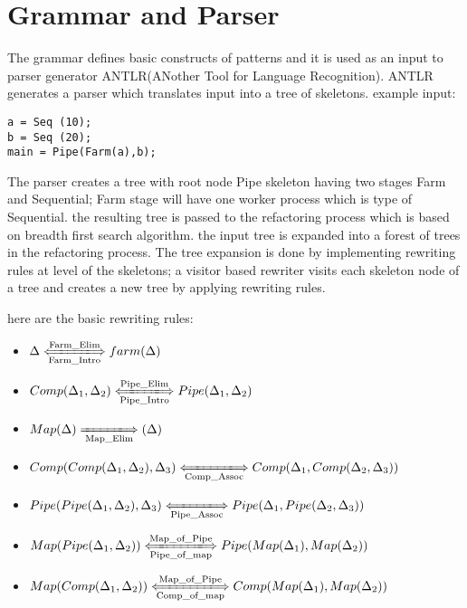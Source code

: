 \documentclass[12pt]{report}
\begin{document}
	
\title{}

\maketitle

\section{Grammar and Parser}
The grammar defines basic constructs of patterns and it is used as an input to parser generator ANTLR(ANother Tool for Language Recognition). ANTLR generates a parser which translates input into a tree of skeletons. example input:

\begin{lstlisting}[style=refactor, caption={example input program},label={code1}]
a = Seq (10);
b = Seq (20);
main = Pipe(Farm(a),b);
\end{lstlisting}
The parser creates a tree with root node Pipe skeleton having two stages Farm and Sequential; Farm stage will have one worker process which is type of Sequential. the resulting tree is passed to the refactoring process which is based on  breadth first search algorithm. the input tree is expanded into a forest of trees in the refactoring process. The tree expansion is done by implementing rewriting rules at level of the skeletons; a visitor based rewriter visits each skeleton node of a tree  and creates a new tree by applying rewriting rules. 

here are the basic rewriting rules:

\begin{itemize}
\item $\Delta \xLongleftrightarrow[\text{Farm\_Intro}]{\text{Farm\_Elim}} farm (\Delta)$\\
\item $Comp(\Delta_1, \Delta_2 )\xLongleftrightarrow[\text{Pipe\_Intro}]{\text{Pipe\_Elim}} Pipe (\Delta_1,\Delta_2)$\\
\item $Map(\Delta) \xLongrightarrow[\text{Map\_Elim}]{\text{}}  (\Delta)$\\
\item $Comp(Comp(\Delta_1, \Delta_2 ),\Delta_3)\xLongleftrightarrow[\text{Comp\_Assoc}]{\text{}} Comp (\Delta_1,Comp(\Delta_2,\Delta_3))$\\
\item $Pipe(Pipe(\Delta_1, \Delta_2 ),\Delta_3)\xLongleftrightarrow[\text{Pipe\_Assoc}]{\text{}} Pipe (\Delta_1,Pipe(\Delta_2,\Delta_3))$\\
\item $Map(Pipe(\Delta_1, \Delta_2 ))\xLongleftrightarrow[\text{Pipe\_of\_map}]{\text{Map\_of\_Pipe}} Pipe (Map(\Delta_1),Map(\Delta_2))$\\
\item $Map(Comp(\Delta_1, \Delta_2 ))\xLongleftrightarrow[\text{Comp\_of\_map}]{\text{Map\_of\_Pipe}} Comp (Map(\Delta_1),Map(\Delta_2))$\\
\end{itemize}
\end{document}
